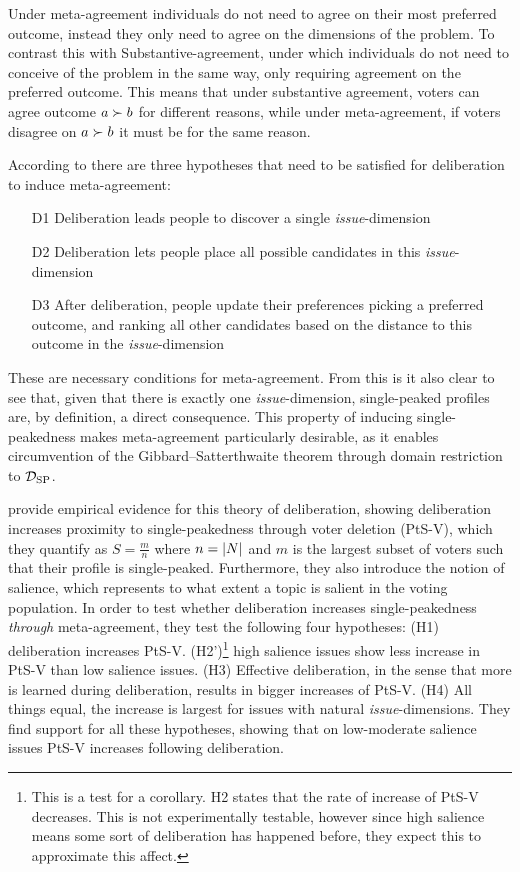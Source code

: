 Under meta-agreement individuals do not need to agree on their most
preferred outcome, instead they only need to agree on the dimensions of the
problem. To contrast this with Substantive-agreement, under which individuals
do not need to conceive of the problem in the same way, only requiring
agreement on the preferred outcome. This means that under substantive
agreement, voters can agree outcome $a \succ b$ for different reasons, while
under meta-agreement, if voters disagree on $a \succ b$ it must be for the same
reason.

According to \citet{listTwoConceptsAgreement2002} there are three hypotheses that need to be satisfied for deliberation to induce meta-agreement:
\begin{enumerate}
	\label{list:meta-agreement-checklist}
	\setlength\itemsep{1px}
	\item [D1] Deliberation leads people to discover a single \emph{issue}-dimension
	\item [D2] Deliberation lets people place all possible candidates in this \emph{issue}-dimension
	\item [D3] After deliberation, people update their preferences picking
	      a preferred outcome, and ranking all other candidates based on the distance to this outcome in the \emph{issue}-dimension
\end{enumerate}

These are necessary conditions for meta-agreement. From this is it also
clear to see that, given that there is exactly one \emph{issue}-dimension,
single-peaked profiles are, by definition, a direct consequence. This property
of inducing single-peakedness makes meta-agreement particularly desirable, as
it enables circumvention of the Gibbard–Satterthwaite theorem
\citep{gibbardManipulationVotingSchemes1973,
	satterthwaiteStrategyproofnessArrowsConditions1975} through
domain restriction to $\mathcal{D}_{\textnormal{SP}}$.

\citet{listDeliberationSinglePeakednessPossibility2013} provide empirical
evidence for this theory of deliberation, showing deliberation increases
proximity to single-peakedness through voter deletion (PtS-V), which they quantify as $S= \frac{m}{n}$
where $n = |N|$ and $m$ is the largest subset of voters such that their
profile is single-peaked. Furthermore, they also introduce the notion of
salience, which represents to what extent a topic is salient in the voting
population. In order to test whether deliberation increases single-peakedness
\emph{through} meta-agreement, they test the following four hypotheses: (H1)
deliberation increases PtS-V. (H2')\footnote{This is a
	test for a corollary. H2 states that the rate of increase of PtS-V decreases. This is not experimentally testable, however since
	high salience means some sort of deliberation has happened before, they expect
	this to approximate this affect.} high salience issues show less increase in
PtS-V than low salience issues. (H3) Effective deliberation, in the sense that
more is learned during deliberation, results in bigger increases of PtS-V. (H4)
All things equal, the increase is largest for issues with natural
\emph{issue}-dimensions. They find support for all these hypotheses, showing
that on low-moderate salience issues PtS-V increases following deliberation.

